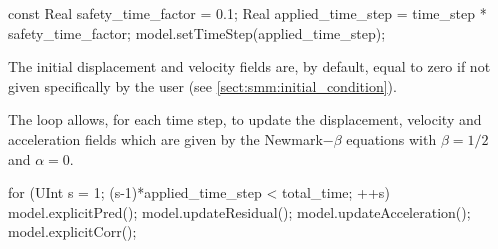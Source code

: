 \begin{cpp}
  const Real safety_time_factor = 0.1;
  Real applied_time_step = time_step * safety_time_factor;
  model.setTimeStep(applied_time_step);
\end{cpp}

The initial displacement  and velocity fields are, by default,  equal to zero if
not given specifically by the user (see \ref{sect:smm:initial_condition}).

The loop  allows, for each time  step, to update the  displacement, velocity and
acceleration  fields  which are  given  by  the  Newmark$-\beta$ equations  with
$\beta=1/2$ and $\alpha=0$.

\begin{cpp}
  for (UInt s = 1; (s-1)*applied_time_step < total_time; ++s) {
    model.explicitPred();
    model.updateResidual();
    model.updateAcceleration();
    model.explicitCorr();
  }
\end{cpp}

